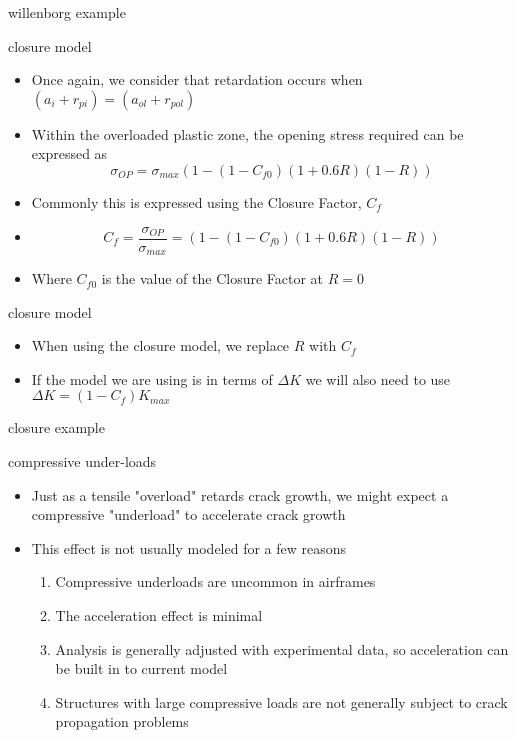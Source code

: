 \documentclass[10pt]{beamer}
\begin{document}
\begin{frame}{willenborg example}
	
\end{frame}

\begin{frame}{closure model}
	\begin{itemize}[<+->]
		\item Once again, we consider that retardation occurs when $(a_i + r_{pi}) = (a_{ol} + r_{pol})$
		\item Within the overloaded plastic zone, the opening stress required can be expressed as
		\begin{equation}
		\sigma_{OP} = \sigma_{max} (1-(1-C_{f0})(1+0.6R)(1-R))
		\end{equation}
		\item Commonly this is expressed using the Closure Factor, $C_f$
		\item[] \begin{equation}
		C_f = \frac{\sigma_{OP}}{\sigma_{max}} = (1-(1-C_{f0})(1+0.6R)(1-R))
		\end{equation}
		\item Where $C_{f0}$ is the value of the Closure Factor at $R=0$
	\end{itemize}
\end{frame}

\begin{frame}{closure model}
	\begin{itemize}[<+->]
		\item When using the closure model, we replace $R$ with $C_f$
		\item If the model we are using is in terms of $\Delta K$ we will also need to use $\Delta K = (1-C_f) K_{max}$
	\end{itemize}
\end{frame}

\begin{frame}{closure example}
	
\end{frame}

\begin{frame}{compressive under-loads}
	\begin{itemize}[<+->]
		\item Just as a tensile "overload" retards crack growth, we might expect a compressive "underload" to accelerate crack growth
		\item This effect is not usually modeled for a few reasons
		\begin{enumerate}
			\item Compressive underloads are uncommon in airframes
			\item The acceleration effect is minimal
			\item Analysis is generally adjusted with experimental data, so acceleration can be built in to current model
			\item Structures with large compressive loads are not generally subject to crack propagation problems
		\end{enumerate}
	\end{itemize}
\end{frame}
\end{document}
